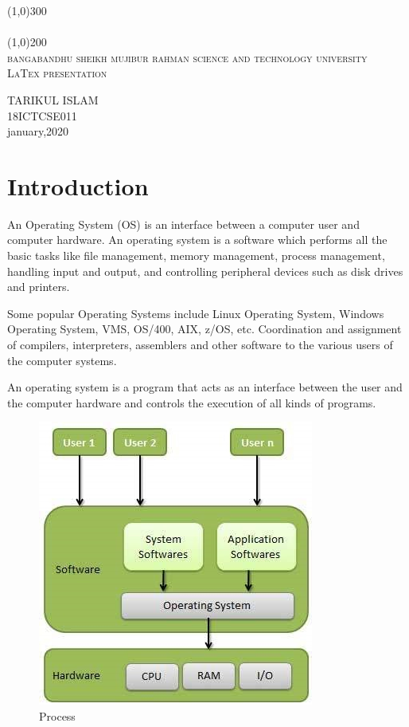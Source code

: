 \documentclass[a4paper,10pt]{article}
\begin{document}
  \begin{titlepage}
  \begin{center}
  \line(1,0){300}\\
  [.25in]
  \\
  [2mm]
  \line(1,0){200}\\
  [1.5cm]
  \textsc{\LARGE bangabandhu sheikh mujibur rahman science and technology university}\\
  [.75cm]
  \textsc{\small LaTex presentation}\\
  [10cm]
  \end{center}
 
  
  \begin{flushright}
  \textsc{\huge TARIKUL ISLAM}\\
  \Large 18ICTCSE011\\
  january,2020
  \end{flushright}
  \end{titlepage}
  
 \section*{Introduction}
 
  An Operating System (OS) is an interface between a computer user and computer hardware. An operating system is a software which performs all the basic tasks like file management, memory management, process management, handling input and output, and controlling peripheral devices such as disk drives and printers.

Some popular Operating Systems include Linux Operating System, Windows Operating System, VMS, OS/400, AIX, z/OS, etc. Coordination and assignment of compilers, interpreters, assemblers and other software to the various users of the computer systems.

An operating system is a program that acts as an interface between the user and the computer hardware and controls the execution of all kinds of programs.
\begin{figure}[h]
\centering
\includegraphics{addk}
\caption{Process}
\end{figure}
 \cleardoublepage
  
\end{document}
